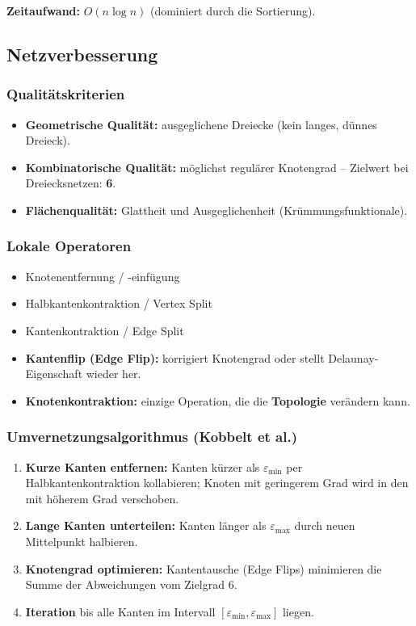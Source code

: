 \documentclass[12pt, a4paper]{article}
\begin{document}
\textbf{Zeitaufwand:} $O(n \log n)$ (dominiert durch die Sortierung).

\subsection{Netzverbesserung}

\subsubsection*{Qualitätskriterien}
\begin{itemize}
  \item \textbf{Geometrische Qualität:} ausgeglichene Dreiecke (kein langes, dünnes Dreieck).
  \item \textbf{Kombinatorische Qualität:} möglichst regulärer Knotengrad -- Zielwert bei Dreiecksnetzen: \textbf{6}.
  \item \textbf{Flächenqualität:} Glattheit und Ausgeglichenheit (Krümmungsfunktionale).
\end{itemize}

\subsubsection*{Lokale Operatoren}
\begin{itemize}
  \item Knotenentfernung / -einfügung
  \item Halbkantenkontraktion / Vertex Split
  \item Kantenkontraktion / Edge Split
  \item \textbf{Kantenflip (Edge Flip):} korrigiert Knotengrad oder stellt Delaunay-Eigenschaft wieder her.
  \item \textbf{Knotenkontraktion:} einzige Operation, die die \textbf{Topologie} verändern kann.
\end{itemize}

\subsubsection*{Umvernetzungsalgorithmus (Kobbelt et al.)}
\begin{enumerate}
  \item \textbf{Kurze Kanten entfernen:} Kanten kürzer als $\varepsilon_{\min}$ per Halbkantenkontraktion kollabieren; Knoten mit geringerem Grad wird in den mit höherem Grad verschoben.
  \item \textbf{Lange Kanten unterteilen:} Kanten länger als $\varepsilon_{\max}$ durch neuen Mittelpunkt halbieren.
  \item \textbf{Knotengrad optimieren:} Kantentausche (Edge Flips) minimieren die Summe der Abweichungen vom Zielgrad 6.
  \item \textbf{Iteration} bis alle Kanten im Intervall $[\varepsilon_{\min}, \varepsilon_{\max}]$ liegen.
\end{enumerate}
\end{document}
